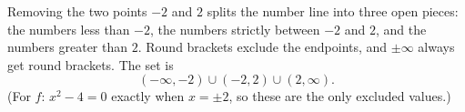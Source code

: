Removing the two points $-2$ and $2$ splits the number line into three open pieces: the numbers less than $-2$, the numbers strictly between $-2$ and $2$, and the numbers greater than $2$. Round brackets exclude the endpoints, and $\pm\infty$ always get round brackets. The set is
\[\boxed{(-\infty,-2)\cup(-2,2)\cup(2,\infty)}.\]
(For $f$: $x^2-4=0$ exactly when $x=\pm2$, so these are the only excluded values.)
